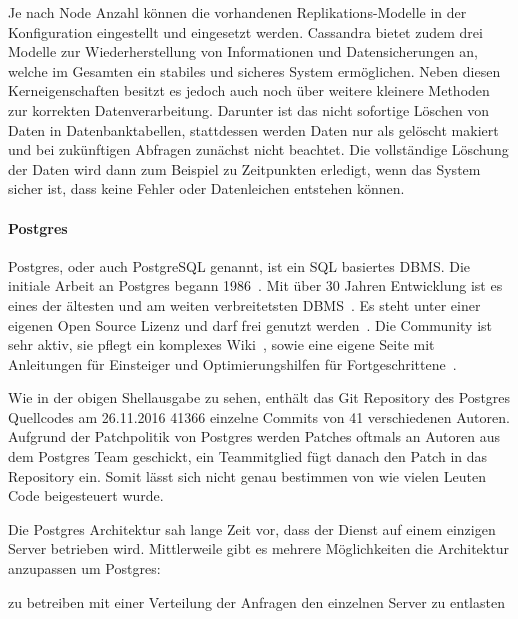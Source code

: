 Je nach Node Anzahl können die vorhandenen Replikations-Modelle in der
Konfiguration eingestellt und eingesetzt werden. Cassandra bietet zudem drei
Modelle zur Wiederherstellung von Informationen und Datensicherungen an, welche
im Gesamten ein stabiles und sicheres System ermöglichen. Neben diesen
Kerneigenschaften besitzt es jedoch auch noch über weitere kleinere Methoden
zur korrekten Datenverarbeitung. Darunter ist das nicht sofortige Löschen von
Daten in Datenbanktabellen, stattdessen werden Daten nur als gelöscht makiert
und bei zukünftigen Abfragen zunächst nicht beachtet. Die vollständige Löschung
der Daten wird dann zum Beispiel zu Zeitpunkten erledigt, wenn das System
sicher ist, dass keine Fehler oder Datenleichen entstehen können.
\nl%

\paragraph{Postgres}
\label{paragraph:postgres}
Postgres, oder auch PostgreSQL genannt, ist ein \gls{SQL} basiertes \gls{DBMS}.
Die initiale Arbeit an Postgres begann 1986~\cite{old_postgres}. Mit über 30
Jahren Entwicklung ist es eines der ältesten und am weiten verbreitetsten
DBMS~\cite{db_ranking}. Es steht unter einer eigenen Open Source Lizenz und
darf frei genutzt werden~\cite{postgres_license}. Die Community ist sehr aktiv,
sie pflegt ein komplexes Wiki~\cite{postgres_wiki}, sowie eine eigene Seite mit
Anleitungen für Einsteiger und Optimierungshilfen für
Fortgeschrittene~\cite{postgres_tutorial}.



Wie in der obigen Shellausgabe zu sehen, enthält das \gls{Git} \gls{Repository}
des Postgres Quellcodes am 26.11.2016 41366 einzelne Commits von 41
verschiedenen Autoren. Aufgrund der Patchpolitik von Postgres werden Patches
oftmals an Autoren aus dem Postgres Team geschickt, ein Teammitglied fügt
danach den Patch in das Repository ein. Somit lässt sich nicht genau bestimmen
von wie vielen Leuten Code beigesteuert wurde.

Die Postgres Architektur sah lange Zeit vor, dass der Dienst auf einem einzigen
Server betrieben wird. Mittlerweile gibt es mehrere Möglichkeiten die
Architektur anzupassen um Postgres:

\begin{outline}
  \1  zu betreiben
  \1 
  \1 mit einer Verteilung der Anfragen den einzelnen Server zu entlasten
\end{outline}

